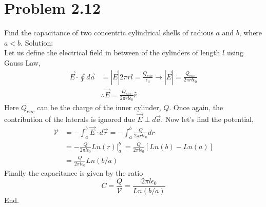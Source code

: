 \section{Problem 2.12}
Find the capacitance of two concentric cylindrical shells of radious $a$ and $b$, where $a<b$. Solution: \\
Let us define the electrical field in between of the cylinders of length $l$ using Gauss Law,
\begin{align}
	\vec{E}\cdot\oint d\vec{a} &= |\vec{E}|2\pi r l  = \frac{Q_{enc}}{\epsilon_0} 
	\rightarrow	|\vec{E}| = \frac{Q_{enc}}{2\pi r l \epsilon_0} \\
	&\therefore \vec{E} = \frac{Q_{enc}}{2\pi r l \epsilon_0} \hat{r}
\end{align}
Here $Q_{enc}$ can be the charge of the inner cylinder, $Q$. Once again, the contribution of the laterals is ignored due $\vec{E} \perp d\vec{a}$. Now let's find the potential,
\begin{align}
	\mathcal{V} 	&= -\int_{a}^{b} \vec{E}\cdot d\vec{r} 
						 = -\int_{a}^{b} \frac{Q}{2\pi r l \epsilon_0}dr \\
						&= -\frac{Q}{2\pi l\epsilon_0} Ln(r)|_{a}^{b}\
						 =  \frac{Q}{2\pi l\epsilon_0} \left[ Ln(b)-Ln(a)\right]\\
						&=  \frac{Q}{2\pi l\epsilon_0} Ln(b/a)
\end{align}
Finally the capacitance is given by the ratio
\begin{equation}
	C = \frac{Q}{\mathcal{V}} = \frac{2\pi l\epsilon_0}{Ln(b/a)}
\end{equation}
End.
